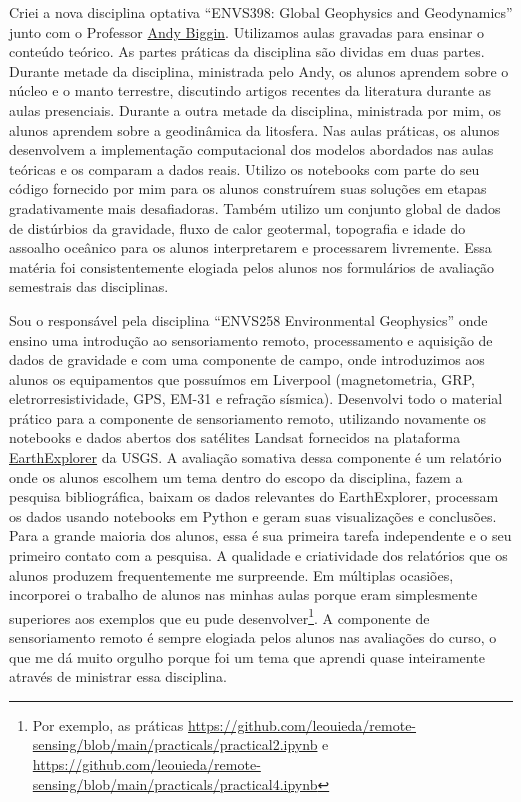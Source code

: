 \documentclass[10pt,a4paper,oneside]{book}
\begin{document}
Criei a nova disciplina optativa ``ENVS398: Global Geophysics and Geodynamics''
junto com o Professor
\href{https://www.liverpool.ac.uk/environmental-sciences/staff/andrew-biggin/}{Andy Biggin}.
Utilizamos aulas gravadas para ensinar o conteúdo teórico.
As partes práticas da disciplina são dividas em duas partes.
Durante metade da disciplina, ministrada pelo Andy, os alunos aprendem sobre o
núcleo e o manto terrestre, discutindo artigos recentes da literatura durante
as aulas presenciais.
Durante a outra metade da disciplina, ministrada por mim, os alunos aprendem
sobre a geodinâmica da litosfera.
Nas aulas práticas, os alunos desenvolvem a implementação computacional dos
modelos abordados nas aulas teóricas e os comparam a dados reais.
Utilizo os notebooks com parte do seu código fornecido por mim para os alunos
construírem suas soluções em etapas gradativamente mais desafiadoras.
Também utilizo um conjunto global de dados de distúrbios da gravidade, fluxo de
calor geotermal, topografia e idade do assoalho oceânico para os alunos
interpretarem e processarem livremente.
Essa matéria foi consistentemente elogiada pelos alunos nos formulários de
avaliação semestrais das disciplinas.

Sou o responsável pela disciplina ``ENVS258 Environmental Geophysics'' onde
ensino uma introdução ao sensoriamento remoto, processamento e aquisição de
dados de gravidade e com uma componente de campo, onde introduzimos aos alunos
os equipamentos que possuímos em Liverpool (magnetometria, GRP,
eletrorresistividade, GPS, EM-31 e refração sísmica).
Desenvolvi todo o material prático para a componente de sensoriamento remoto,
utilizando novamente os notebooks e dados abertos dos satélites Landsat
fornecidos na plataforma \href{https://earthexplorer.usgs.gov/}{EarthExplorer}
da USGS.
A avaliação somativa dessa componente é um relatório onde os alunos escolhem um
tema dentro do escopo da disciplina, fazem a pesquisa bibliográfica, baixam os
dados relevantes do EarthExplorer, processam os dados usando notebooks em
Python e geram suas visualizações e conclusões.
Para a grande maioria dos alunos, essa é sua primeira tarefa independente e o
seu primeiro contato com a pesquisa.
A qualidade e criatividade dos relatórios que os alunos produzem frequentemente
me surpreende.
Em múltiplas ocasiões, incorporei o trabalho de alunos nas minhas aulas porque
eram simplesmente superiores aos exemplos que eu pude desenvolver\footnote{Por
exemplo, as práticas
\url{https://github.com/leouieda/remote-sensing/blob/main/practicals/practical2.ipynb}
e
\url{https://github.com/leouieda/remote-sensing/blob/main/practicals/practical4.ipynb}}.
A componente de sensoriamento remoto é sempre elogiada pelos alunos nas
avaliações do curso, o que me dá muito orgulho porque foi um tema que aprendi
quase inteiramente através de ministrar essa disciplina.
\end{document}
